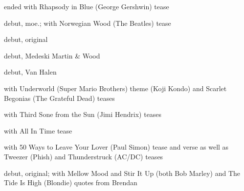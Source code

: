 {\begin{supertabular}{p{0.03\textwidth}p{0.97\textwidth}}
\end{supertabular}
}{\item[] [1] ended with Rhapsody in Blue (George Gershwin) tease 
\item[] [2] debut, moe.; with Norwegian Wood (The Beatles) tease 
\item[] [3] debut, original 
\item[] [4] debut, Medeski Martin \& Wood 
\item[] [5] debut, Van Halen 
\item[] [6] with Underworld (Super Mario Brothers) theme (Koji Kondo) and Scarlet Begonias (The Grateful Dead) teases 
\item[] [7] with Third Sone from the Sun (Jimi Hendrix) teases 
\item[] [8] with All In Time tease 
\item[] [9] with 50 Ways to Leave Your Lover (Paul Simon) tease and verse as well as Tweezer (Phish) and Thunderstruck (AC/DC) teases 
\item[] [10] debut, original; with Mellow Mood and Stir It Up (both Bob Marley) and The Tide Is High (Blondie) quotes from Brendan 
}{}{}
